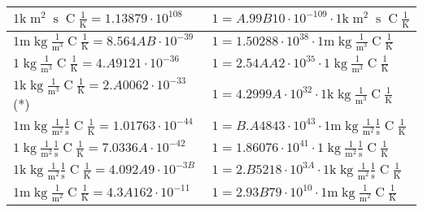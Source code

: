 \begin{center}
\begin{longtable}{l l}
{\color{gray}$1 \bm{\mathrm{ k}}{\operatorname{m}^2}{\operatorname{s}}{\operatorname{C}}\frac1{\operatorname{K}} = 1.13879\cdot10^{108} $}   & {\color{gray}$ 1 = A.99B10\cdot10^{-109} \cdot 1 \bm{\mathrm{ k}}{\operatorname{m}^2}{\operatorname{s}}{\operatorname{C}}\frac1{\operatorname{K}}$}  \\
\hline{\color{gray}$1 \bm{\mathrm{ m}}\operatorname{kg}\frac1{\operatorname{m}^3}{}{\operatorname{C}}\frac1{\operatorname{K}} = 8.564AB\cdot10^{-39} $}   & {\color{gray}$ 1 = 1.50288\cdot10^{38} \cdot 1 \bm{\mathrm{ m}}\operatorname{kg}\frac1{\operatorname{m}^3}{}{\operatorname{C}}\frac1{\operatorname{K}}$}  \\
{\color{black}$1 \bm{\mathrm{ }}\operatorname{kg}\frac1{\operatorname{m}^3}{}{\operatorname{C}}\frac1{\operatorname{K}} = 4.A9121\cdot10^{-36} $}   & {\color{black}$ 1 = 2.54AA2\cdot10^{35} \cdot 1 \bm{\mathrm{ }}\operatorname{kg}\frac1{\operatorname{m}^3}{}{\operatorname{C}}\frac1{\operatorname{K}}$}  \\
{\color{gray}$1 \bm{\mathrm{ k}}\operatorname{kg}\frac1{\operatorname{m}^3}{}{\operatorname{C}}\frac1{\operatorname{K}} = 2.A0062\cdot10^{-33} $}\quad(*) & {\color{gray}$ 1 = 4.2999A\cdot10^{32} \cdot 1 \bm{\mathrm{ k}}\operatorname{kg}\frac1{\operatorname{m}^3}{}{\operatorname{C}}\frac1{\operatorname{K}}$}  \\
{\color{gray}$1 \bm{\mathrm{ m}}\operatorname{kg}\frac1{\operatorname{m}^2}\frac1{\operatorname{s}}{\operatorname{C}}\frac1{\operatorname{K}} = 1.01763\cdot10^{-44} $}   & {\color{gray}$ 1 = B.A4843\cdot10^{43} \cdot 1 \bm{\mathrm{ m}}\operatorname{kg}\frac1{\operatorname{m}^2}\frac1{\operatorname{s}}{\operatorname{C}}\frac1{\operatorname{K}}$}  \\
{\color{black}$1 \bm{\mathrm{ }}\operatorname{kg}\frac1{\operatorname{m}^2}\frac1{\operatorname{s}}{\operatorname{C}}\frac1{\operatorname{K}} = 7.0336A\cdot10^{-42} $}   & {\color{black}$ 1 = 1.86076\cdot10^{41} \cdot 1 \bm{\mathrm{ }}\operatorname{kg}\frac1{\operatorname{m}^2}\frac1{\operatorname{s}}{\operatorname{C}}\frac1{\operatorname{K}}$}  \\
{\color{gray}$1 \bm{\mathrm{ k}}\operatorname{kg}\frac1{\operatorname{m}^2}\frac1{\operatorname{s}}{\operatorname{C}}\frac1{\operatorname{K}} = 4.092A9\cdot10^{-3B} $}   & {\color{gray}$ 1 = 2.B5218\cdot10^{3A} \cdot 1 \bm{\mathrm{ k}}\operatorname{kg}\frac1{\operatorname{m}^2}\frac1{\operatorname{s}}{\operatorname{C}}\frac1{\operatorname{K}}$}  \\
{\color{gray}$1 \bm{\mathrm{ m}}\operatorname{kg}\frac1{\operatorname{m}^2}{}{\operatorname{C}}\frac1{\operatorname{K}} = 4.3A162\cdot10^{-11} $}   & {\color{gray}$ 1 = 2.93B79\cdot10^{10} \cdot 1 \bm{\mathrm{ m}}\operatorname{kg}\frac1{\operatorname{m}^2}{}{\operatorname{C}}\frac1{\operatorname{K}}$}  \\

\end{longtable}
\end{center}
